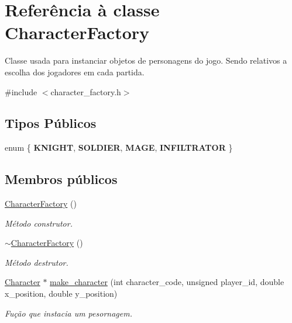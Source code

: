 \hypertarget{classCharacterFactory}{}\section{Referência à classe Character\+Factory}
\label{classCharacterFactory}


Classe usada para instanciar objetos de personagens do jogo. Sendo relativos a escolha dos jogadores em cada partida.  




{\ttfamily \#include $<$character\+\_\+factory.\+h$>$}

\subsection*{Tipos Públicos}
\begin{DoxyCompactItemize}
\item 
enum \{ {\bfseries K\+N\+I\+G\+HT}, 
{\bfseries S\+O\+L\+D\+I\+ER}, 
{\bfseries M\+A\+GE}, 
{\bfseries I\+N\+F\+I\+L\+T\+R\+A\+T\+OR}
 \}
\end{DoxyCompactItemize}
\subsection*{Membros públicos}
\begin{DoxyCompactItemize}
\item 
\mbox{\label{classCharacterFactory_a0014a7de42b681ce872c728ea91bcfc1}} 
\mbox{\hyperlink{classCharacterFactory_a0014a7de42b681ce872c728ea91bcfc1}{Character\+Factory}} ()
\begin{DoxyCompactList}\small\item\em Método construtor. \end{DoxyCompactList}\item 
\mbox{\label{classCharacterFactory_a27508feea862d22571bb6b9344f34f44}} 
\mbox{\hyperlink{classCharacterFactory_a27508feea862d22571bb6b9344f34f44}{$\sim$\+Character\+Factory}} ()
\begin{DoxyCompactList}\small\item\em Método destrutor. \end{DoxyCompactList}\item 
\mbox{\hyperlink{classCharacter}{Character}} $\ast$ \mbox{\hyperlink{classCharacterFactory_a6ebcf8e9408d89dc4c40ef12e9d09c15}{make\+\_\+character}} (int character\+\_\+code, unsigned player\+\_\+id, double x\+\_\+position, double y\+\_\+position)
\begin{DoxyCompactList}\small\item\em Fução que instacia um pesornagem. \end{DoxyCompactList}\end{DoxyCompactItemize}

